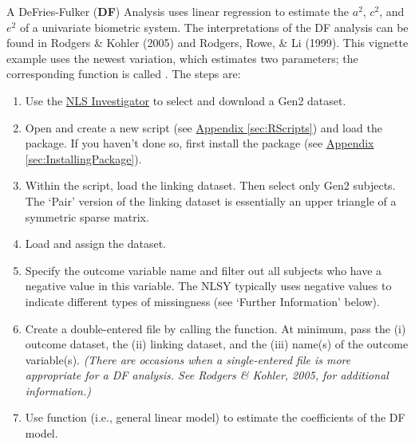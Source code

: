 \documentclass{article}\usepackage[]{graphicx}\usepackage[]{color}
\begin{document}
A DeFries-Fulker (\textbf{DF}) Analysis uses linear regression to estimate the $a^2$, $c^2$, and $e^2$ of a univariate biometric system.  The interpretations of the DF analysis can be found in Rodgers \& Kohler (2005) and Rodgers, Rowe, \& Li (1999).  This  vignette example uses the newest variation, which estimates two parameters; the corresponding function is called .
The steps are:
\begin{enumerate}
\item Use the \hyperref[term:NlsInvestigator]{NLS Investigator} to select and download a Gen2 dataset.  

\item Open \R{} and create a new script (see \hyperref[sec:RScripts]{Appendix \ref*{sec:RScripts}}) and load the  package.  If you haven't done so, first install the  package (see \hyperref[sec:InstallingPackage]{Appendix \ref*{sec:InstallingPackage}}).
\item Within the \R{} script, load the linking dataset.  Then select only Gen2 subjects.  The `Pair' version of the linking dataset is essentially an upper triangle of a symmetric sparse matrix.
\item Load and assign the  dataset.
\item Specify the outcome variable name and filter out all subjects who have a negative value in this variable.  The NLSY typically uses negative values to indicate different types of missingness (see `Further Information' below).   
\item Create a double-entered file by calling the  function.  At minimum, pass the (i) outcome dataset, the (ii) linking dataset, and the (iii) name(s) of the outcome variable(s).  \emph{(There are occasions when a single-entered file is more appropriate for a DF analysis.  See Rodgers \& Kohler, 2005, for additional information.)}
\item Use  function (i.e., general linear model) to estimate the coefficients of the DF model.  
\end{enumerate}
\end{document}
